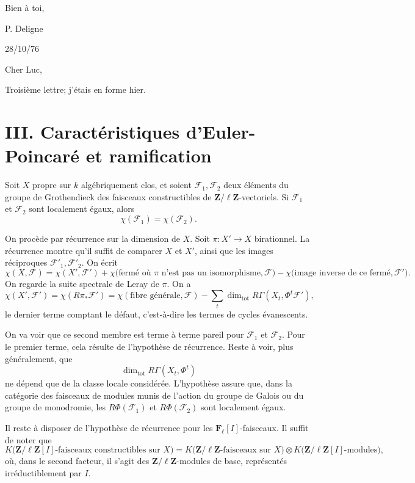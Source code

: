 \documentclass[11pt]{article}
\newcommand{\F}{\mathcal F}
\newcommand{\Zell}{\mathbf Z/\ell\mathbf Z}
\newcommand{\Fell}{\mathbf F_\ell}
\DeclareMathOperator{\Tot}{tot}
\begin{document}
Bien à toi,

\hspace{2em}P. Deligne

\newpage

\begin{flushright}
28/10/76
\end{flushright}

Cher Luc,

Troisième lettre; j'étais en forme hier.

\section*{III. Caractéristiques d'Euler-Poincaré et ramification}

Soit \(X\) propre sur \(k\) algébriquement clos, et soient \(\F_1,\F_2\) deux éléments du groupe de Grothendieck des faisceaux constructibles de \(\Zell\)-vectoriels. Si \(\F_1\) et \(\F_2\) sont localement égaux, alors
\[
  \chi(\F_1)=\chi(\F_2).
\]

On procède par récurrence sur la dimension de \(X\). Soit \(\pi:X'\to X\) birationnel. La récurrence montre qu'il suffit de comparer \(X\) et \(X'\), ainsi que les images réciproques \(\F'_1,\F'_2\). On écrit
\[
  \chi(X,\F)=\chi(X',\F')+
  \chi\bigl(\text{fermé où }\pi\text{ n'est pas un isomorphisme},\F\bigr)
  -\chi\bigl(\text{image inverse de ce fermé},\F'\bigr).
\]
On regarde la suite spectrale de Leray de \(\pi\). On a
\[
  \chi(X',\F')
  =\chi(R\pi_*\F')
  =\chi(\text{fibre générale},\F)
   -\sum_t \dim_{\Tot}R\Gamma(X_t,\Phi^t\F'),
\]
le dernier terme comptant le défaut, c'est-à-dire les termes de cycles évanescents.

On va voir que ce second membre est terme à terme pareil pour \(\F_1\) et \(\F_2\). Pour le premier terme, cela résulte de l'hypothèse de récurrence. Reste à voir, plus généralement, que
\[
  \dim_{\Tot} R\Gamma(X_t,\Phi^t)
\tag{1}
\]
ne dépend que de la classe locale considérée. L'hypothèse assure que, dans la catégorie des faisceaux de modules munis de l'action du groupe de Galois ou du groupe de monodromie, les \(R\Phi(\F_1)\) et \(R\Phi(\F_2)\) sont localement égaux.

Il reste à disposer de l'hypothèse de récurrence pour les \(\Fell[I]\)-faisceaux. Il suffit de noter que
\[
K\bigl(\Zell[I]\text{-faisceaux constructibles sur }X\bigr)
=
K\bigl(\Zell\text{-faisceaux sur }X\bigr)
\otimes
K\bigl(\Zell[I]\text{-modules}\bigr),
\]
où, dans le second facteur, il s'agit des \(\Zell\)-modules de base, représentés irréductiblement par \(I\).
\end{document}
